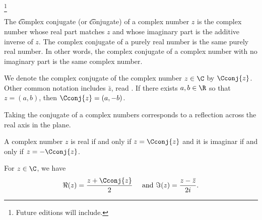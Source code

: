 
\footnote{Future editions will include.}


The \t{complex conjugate} (or \t{conjugate}) of a complex number $z$ is the complex number whose real part matches $z$ and whose imaginary part is the additive inverse of $z$.
The complex conjugate of a purely real number is the same purely real number.
In other words, the complex conjugate of a complex number with no imaginary part is the same complex number.


We denote the complex conjugate of the complex number $z \in \C$ by $\Cconj{z}$.
Other common notation includes $\bar{z}$, read .
If there exists $a, b \in \R$ so that $z = (a, b)$, then $\Cconj{z} = (a, -b)$.


Taking the conjugate of a complex numbers corresponds to a reflection across the real axis in the plane.


A complex number $z$ is real if and only if $z = \Cconj{z}$ and it is imaginar if and only if $z = -\Cconj{z}$.

\begin{proposition}
  For $z \in \C$, we have
  \[
  \Re(z) = \frac{z + \Cconj{z}}{2} \quad \text{ and } \Im(z) = \frac{z - \bar{z}}{2i}.
\]
\end{proposition}

\blankpage
